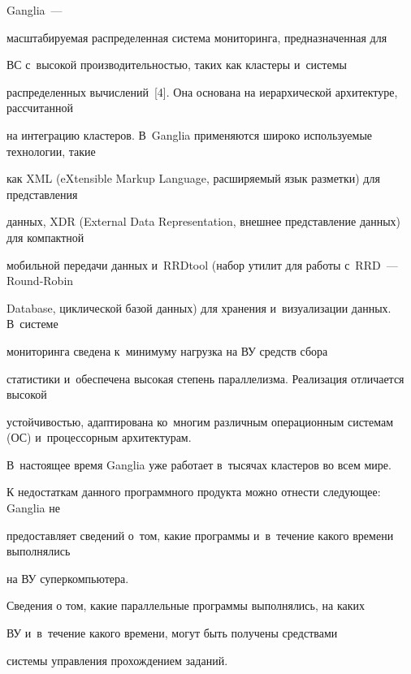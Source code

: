 \mbox{Ganglia}~---


масштабируемая распределенная система мониторинга, предназначенная для


ВС с~высокой производительностью, таких как кластеры и~системы


распределенных вы\-чис\-ле\-ний~[4]. Она основана на иерархической архитектуре, рассчитанной


на интеграцию кластеров. В~\mbox{Ganglia} применяются широко используемые технологии, такие


как XML (eXtensible Markup Language, расширяемый язык разметки) для пред\-став\-ле\-ния


данных, XDR (External Data Representation, внеш\-нее представление данных) для компактной


мобильной передачи данных и~RRDtool (набор утилит для работы с~RRD~--- Round-Robin


Database, циклической базой данных) для хранения и~визуализации данных. В~системе


мониторинга сведена к~минимуму нагрузка на ВУ средств сбора


статистики и~обеспечена высокая степень параллелизма. Реализация отличается высокой


устойчивостью, адаптирована ко~многим различным операционным сис\-те\-мам (ОС) и~процессорным архитектурам.


В~настоящее время \mbox{Ganglia} уже работает в~тысячах кластеров во всем мире.





      К недостаткам данного программного продукта можно отнести следующее: Ganglia не


предоставляет сведений о~том, какие программы и~в~течение какого времени выполнялись


на ВУ суперкомпьютера.





      Сведения о том, какие параллельные программы выполнялись, на каких


ВУ и~в~течение какого времени, могут быть получены средствами


сис\-те\-мы управ\-ле\-ния прохождением заданий.





